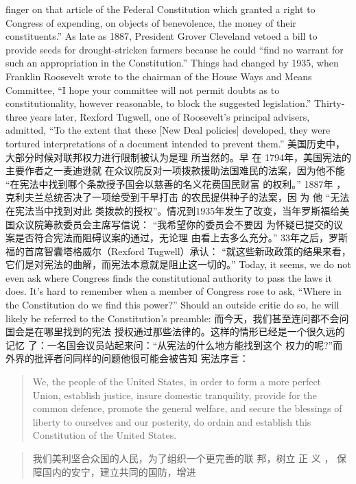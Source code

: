 \begin{paracol}{2}
finger on that article of the Federal Constitution which granted
a right to Congress of expending, on objects of benevolence, the
money of their constituents.'' As late as 1887, President Grover
Cleveland vetoed a bill to provide seeds for drought-stricken
farmers because he could ``find no warrant for such an appropriation in the Constitution.'' Things had changed by 1935, when
Franklin Roosevelt wrote to the chairman of the House Ways
and Means Committee, ``I hope your committee will not permit
doubts as to constitutionality, however reasonable, to block the
suggested legislation.'' Thirty-three years later, Rexford Tugwell, one of Roosevelt's principal advisers, admitted, ``To the extent that these [New Deal policies] developed, they were
tortured interpretations of a document intended to prevent
them.''
\switchcolumn
美国历史中，大部分时候对联邦权力进行限制被认为是理
所当然的。早 在 1794年，美国宪法的主要作者之一麦迪逊就
在众议院反对一项拨款援助法国难民的法案，因为他不能
“在宪法中找到哪个条款授予国会以慈善的名义花费国民财富
的权利。” 1887年 ，克利夫兰总统否决了一项给受到干旱打击
的农民提供种子的法案，因 为 他 “无法在宪法当中找到对此
类拨款的授权”。情况到1935年发生了改变，当年罗斯福给美
国众议院筹款委员会主席写信说： “我希望你的委员会不要因
为怀疑已提交的议案是否符合宪法而阻碍议案的通过，无论理
由看上去多么充分。” 33年之后，罗斯福的首席智囊塔格威尔（Rexford Tugwell）承认： “就这些新政政策的结果来看，它们是对宪法的曲解，而宪法本意就是阻止这一切的。”
\switchcolumn*
Today, it seems, we do not even ask where Congress finds the
constitutional authority to pass the laws it does. It's hard to remember when a member of Congress rose to ask, ``Where in the
Constitution do we find this power?'' Should an outside critic do
so, he will likely be referred to the Constitution's preamble:
\switchcolumn
而今天，我们甚至连问都不会问国会是在哪里找到的宪法
授权通过那些法律的。这样的情形已经是一个很久远的记忆
了：一名国会议员站起来问：“从宪法的什么地方能找到这个
权力的呢?”而外界的批评者问同样的问题他很可能会被告知
宪法序言：
\switchcolumn*
\begin{quote}
We, the people of the United States, in order to form a more perfect Union, establish justice, insure domestic tranquility, provide
for the common defence, promote the general welfare, and secure
the blessings of liberty to ourselves and our posterity, do ordain
and establish this Constitution of the United States.
\end{quote}
\switchcolumn
\begin{quote}
我们美利坚合众国的人民，为了组织一个更完善的联
邦，树立 正 义 ， 保障国内的安宁，建立共同的国防，增进

\end{quote}
\end{paracol}
